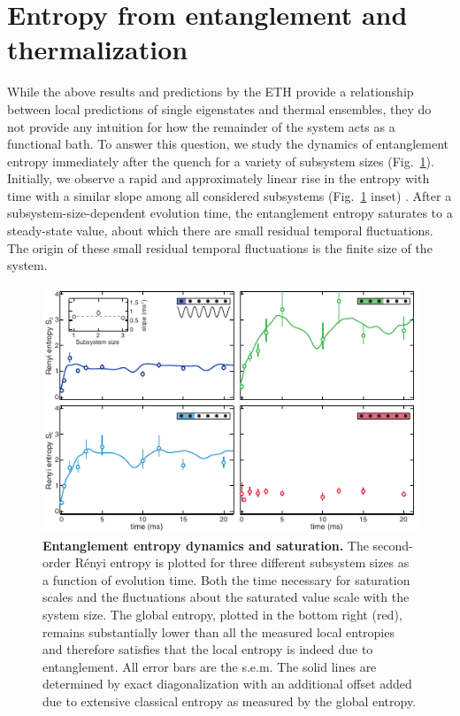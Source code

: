 \section{Entropy from entanglement and thermalization}

While the above results and predictions by the ETH provide a relationship between local predictions of single eigenstates and thermal ensembles, they do not provide any intuition for how the remainder of the system acts as a functional bath. To answer this question, we study the dynamics of entanglement entropy immediately after the quench for a variety of subsystem sizes (Fig.~\ref{fig:ee_dyn}). Initially, we observe a rapid and approximately linear rise in the entropy with time with a similar slope among all considered subsystems (Fig.~\ref{fig:ee_dyn} inset) \cite{Calabrese2005}. After a subsystem-size-dependent evolution time, the entanglement entropy saturates to a steady-state value, about which there are small residual temporal fluctuations. The origin of these small residual temporal fluctuations is the finite size of the system. 

\begin{figure}[t!]
		\includegraphics[width=\columnwidth]{figures/ch4/fig3_ee_dynamics.pdf} 
		\caption{\textbf{Entanglement entropy dynamics and saturation.} The second-order R\'enyi entropy is plotted for three different subsystem sizes as a function of evolution time. Both the time necessary for saturation scales and the fluctuations about the saturated value scale with the system size. The global entropy, plotted in the bottom right (red), remains substantially lower than all the measured local entropies and therefore satisfies that the local entropy is indeed due to entanglement. All error bars are the s.e.m. The solid lines are determined by exact diagonalization with an additional offset added due to extensive classical entropy as measured by the global entropy. }
		\label{fig:ee_dyn}	
\end{figure}

